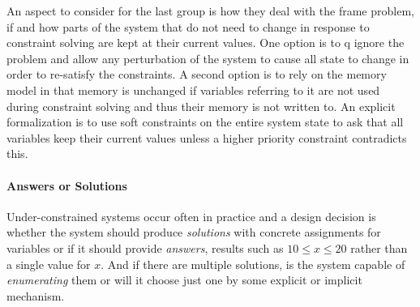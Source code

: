 An aspect to consider for the last group is how they deal with the frame
problem, \ie if and how parts of the system that do not need to change in
response to constraint solving are kept at their current values. One option is
to q ignore the problem and allow any perturbation of the system to cause all
state to change in order to re-satisfy the constraints. A second option is to
rely on the memory model in that memory is unchanged if variables referring to
it are not used during constraint solving and thus their memory is not written
to. An explicit formalization is to use soft constraints on the entire system
state to ask that all variables keep their current values unless a higher
priority constraint contradicts this.
\paragraph*{Answers or Solutions}
Under-constrained systems occur often in practice and a design decision is
whether the system should produce \emph{solutions} with concrete assignments for
variables or if it should provide \emph{answers}, \ie results such as
$10 \leq x \leq 20$ rather than a single value for $x$. And if there are
multiple solutions, is the system capable of \emph{enumerating} them or will it
choose just one by some explicit or implicit mechanism.


